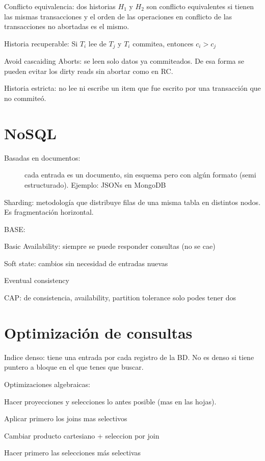 Conflicto equivalencia: dos historias $H_1$ y $H_2$ son conflicto equivalentes si tienen las mismas transacciones y el
orden de las operaciones en conflicto de las transacciones no abortadas es el mismo.

Historia recuperable: Si $T_i$ lee de $T_j$ y $T_i$ commitea, entonces $c_i > c_j$

Avoid cascaiding Aborts: se leen solo datos ya commiteados. De esa forma se pueden evitar los dirty reads sin abortar como en RC.

Historia estricta: no lee ni escribe un item que fue escrito por una transacción que no commiteó.

\section{NoSQL}

\begin{description}
	\item[Basadas en documentos:] cada entrada es un documento, sin esquema pero con algún formato (semi estructurado). Ejemplo: JSONs en MongoDB
\end{description}

Sharding: metodología que distribuye filas de una misma tabla en distintos nodos. Es fragmentación horizontal.

BASE:

Basic Availability: siempre se puede responder consultas (no se cae)

Soft state: cambios sin necesidad de entradas nuevas

Eventual consistency

CAP: de consistencia, availability, partition tolerance solo podes tener dos

\section{Optimización de consultas}

Indice denso: tiene una entrada por cada registro de la BD. No es denso si tiene puntero a bloque en el que tenes que buscar.

Optimizaciones algebraicas:

Hacer proyecciones y selecciones lo antes posible (mas en las hojas).

Aplicar primero los joins mas selectivos

Cambiar producto cartesiano + seleccion por join

Hacer primero las selecciones más selectivas

